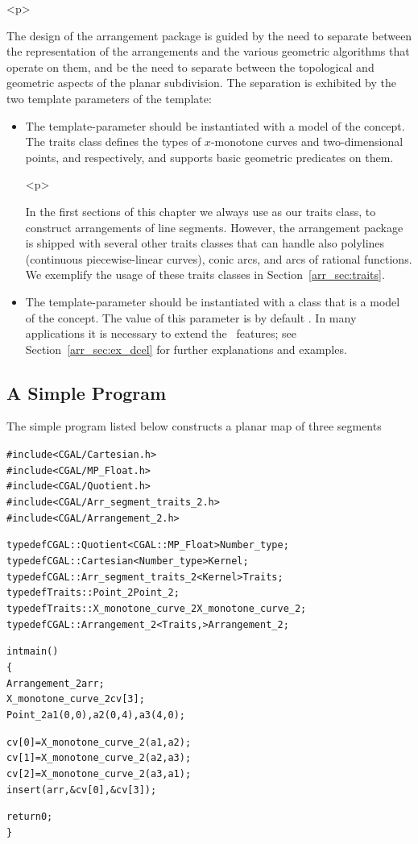 \begin{ccHtmlOnly}<p>\end{ccHtmlOnly}
The design of the arrangement package is guided by the need to
separate between the representation of the arrangements and the
various geometric algorithms that operate on them, and be the need to
separate between the topological and geometric aspects of the planar
subdivision. The separation is exhibited by the two template
parameters of the  template:
\begin{itemize}
\item The  template-parameter should be instantiated with
a model of the  concept. The traits
class defines the types of $x$-monotone curves and two-dimensional
points,  and  respectively, and
supports basic geometric predicates on them.

\begin{ccHtmlOnly}<p>\end{ccHtmlOnly}
In the first sections of this chapter we always use
 as our traits class, to construct
arrangements of line segments. However, the arrangement package is
shipped with several other traits classes that can handle also
polylines (continuous piecewise-linear curves), conic arcs, and arcs
of rational functions. We exemplify the usage of these traits classes
in Section~\ref{arr_sec:traits}.
\item The  template-parameter should be instantiated with
a class that is a model of the  concept. The
value of this parameter is by default
. In many applications it is necessary
to extend the \dcel\ features; see Section~\ref{arr_sec:ex_dcel} for
further explanations and examples.
\end{itemize}

\subsection{A Simple Program}
%
The simple program listed below constructs a planar map of three segments

\begin{alltt}
#include <CGAL/Cartesian.h>
#include <CGAL/MP_Float.h>
#include <CGAL/Quotient.h>
#include <CGAL/Arr_segment_traits_2.h>
#include <CGAL/Arrangement_2.h>

typedef CGAL::Quotient<CGAL::MP_Float>     Number_type;
typedef CGAL::Cartesian<Number_type>       Kernel;
typedef CGAL::Arr_segment_traits_2<Kernel> Traits;
typedef Traits::Point_2                    Point_2;
typedef Traits::X_monotone_curve_2         X_monotone_curve_2;
typedef CGAL::Arrangement_2<Traits,>       Arrangement_2;

int main()
\{
  Arrangement_2 arr;
  X_monotone_curve_2 cv[3];
  Point_2 a1(0,0), a2(0,4), a3(4,0);
 
  cv[0] = X_monotone_curve_2(a1,a2);
  cv[1] = X_monotone_curve_2(a2,a3);
  cv[2] = X_monotone_curve_2(a3,a1);
  insert(arr, &cv[0], &cv[3]);

  return 0;
\}
\end{alltt}


